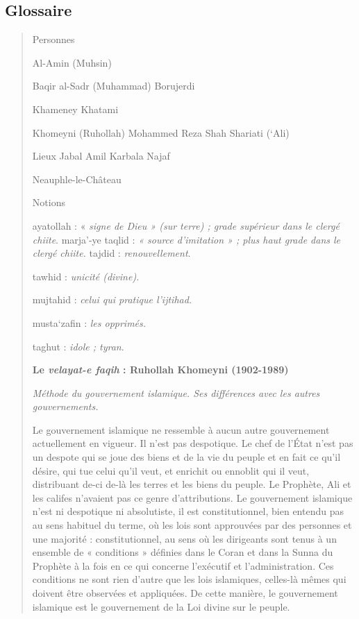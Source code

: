 \hypertarget{glossaire-6}{%
\subsection{\texorpdfstring{{Glossaire}}{Glossaire}}\label{glossaire-6}}

\begin{quote}
{Personnes}

Al-Amin (Muhsin)

Baqir al-Sadr (Muhammad) Borujerdi

Khameney Khatami

Khomeyni (Ruhollah) Mohammed Reza Shah Shariati (`Ali)

{Lieux} Jabal Amil Karbala Najaf

Neauphle-le-Château

{Notions}

ayatollah : « \emph{signe de Dieu » (sur terre) ; grade supérieur dans
le clergé chiite}. marja'-ye taqlid : \emph{« source d'imitation » ;
plus haut grade dans le clergé chiite.} tajdid : \emph{renouvellement}.

tawhid : \emph{unicité (divine).}

mujtahid : \emph{celui qui pratique l'ijtihad.}

musta`zafin : \emph{les opprimés.}

taghut : \emph{idole ; tyran}.

\textbf{Le \emph{velayat-e faqih} : Ruhollah Khomeyni (1902-1989)}

\emph{Méthode du gouvernement islamique. Ses différences avec les autres
gouvernements.}

Le gouvernement islamique ne ressemble à aucun autre gouvernement
actuellement en vigueur. Il n'est pas despotique. Le chef de l'État
n'est pas un despote qui se joue des biens et de la vie du peuple et en
fait ce qu'il désire, qui tue celui qu'il veut, et enrichit ou ennoblit
qui il veut, distribuant de-ci de-là les terres et les biens du peuple.
Le Prophète, Ali et les califes n'avaient pas ce genre d'attributions.
Le gouvernement islamique n'est ni despotique ni absolutiste, il est
constitutionnel, bien entendu pas au sens habituel du terme, où les lois
sont approuvées par des personnes et une majorité : constitutionnel, au
sens où les dirigeants sont tenus à un ensemble de « conditions »
définies dans le Coran et dans la Sunna du Prophète à la fois en ce qui
concerne l'exécutif et l'administration. Ces conditions ne sont rien
d'autre que les lois islamiques, celles-là mêmes qui doivent être
observées et appliquées. De cette manière, le gouvernement islamique est
le gouvernement de la Loi divine sur le peuple.


\end{quote}
